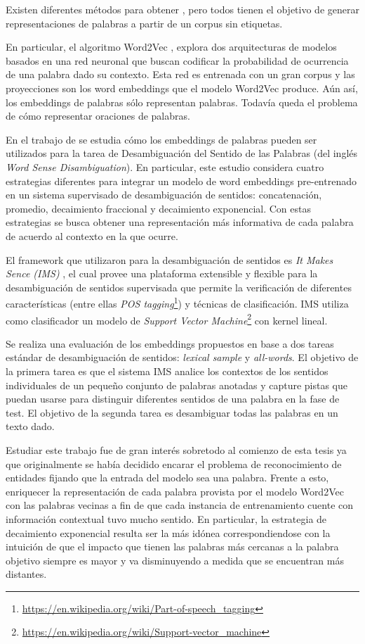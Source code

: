 Existen diferentes métodos para obtener , pero todos tienen el objetivo de generar representaciones de palabras a partir de un corpus sin etiquetas.

En particular, el algoritmo Word2Vec \cite{DBLP:journals/corr/MikolovSCCD13}, explora dos arquitecturas de modelos basados en una red neuronal que buscan codificar la probabilidad de ocurrencia de una palabra dado su contexto. Esta red es entrenada con un gran corpus y las proyecciones son los word embeddings que el modelo Word2Vec produce. Aún así, los embeddings de palabras sólo representan palabras. Todavía queda el problema de cómo representar oraciones de palabras.

En el trabajo de \cite{iacobacci-etal-2016-embeddings} se estudia cómo los embeddings de palabras pueden ser utilizados para la tarea de Desambiguación del Sentido de las Palabras (del inglés \textit{Word Sense Disambiguation}). En particular, este estudio considera cuatro estrategias diferentes para integrar un modelo de word embeddings pre-entrenado en un sistema supervisado de desambiguación de sentidos: concatenación, promedio, decaimiento fraccional y decaimiento exponencial. Con estas estrategias se busca obtener una representación más informativa de cada palabra de acuerdo al contexto en la que ocurre. 

El framework que utilizaron para la desambiguación de sentidos es \textit{It Makes Sence (IMS)} \cite{Zhong:2010:MSW:1858933.1858947}, el cual provee una plataforma extensible y flexible para la desambiguación de sentidos supervisada que permite la verificación de diferentes características (entre ellas \textit{POS tagging}\footnote{\url{https://en.wikipedia.org/wiki/Part-of-speech_tagging}}) y técnicas de clasificación. IMS utiliza como clasificador un modelo de \textit{Support Vector Machine}\footnote{\url{https://en.wikipedia.org/wiki/Support-vector_machine}} con kernel lineal.

Se realiza una evaluación de los embeddings propuestos en base a dos tareas estándar de desambiguación de sentidos: \textit{lexical sample} y \textit{all-words}. El objetivo de la primera tarea es que el sistema IMS analice los contextos de los sentidos individuales de un pequeño conjunto de palabras anotadas y capture pistas que puedan usarse para distinguir diferentes sentidos de una palabra en la fase de test. El objetivo de la segunda tarea es desambiguar todas las palabras en un texto dado.

Estudiar este trabajo fue de gran interés sobretodo al comienzo de esta tesis ya que originalmente se había decidido encarar el problema de reconocimiento de entidades fijando que la entrada del modelo sea una palabra. Frente a esto, enriquecer la representación de cada palabra provista por el modelo Word2Vec con las palabras vecinas a fin de que cada instancia de entrenamiento cuente con información contextual tuvo mucho sentido. En particular, la estrategia de decaimiento exponencial resulta ser la más idónea correspondiendose con la intuición de que el impacto que tienen las palabras más cercanas a la palabra objetivo siempre es mayor y va disminuyendo a medida que se encuentran más distantes.


